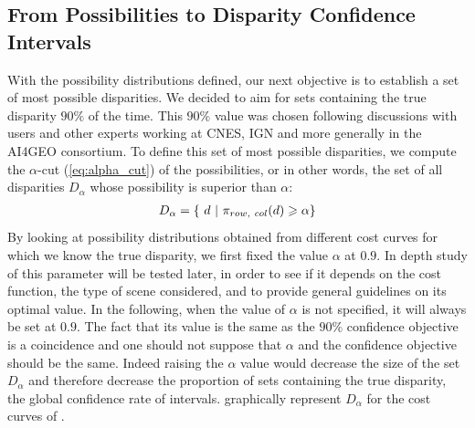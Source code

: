 \subsection{From Possibilities to Disparity Confidence Intervals}
With the possibility distributions defined, our next objective is to establish a set of most possible disparities. We decided to aim for sets containing the true disparity $90\%$ of the time. This $90\%$ value was chosen following discussions with users and other experts working at CNES, IGN and more generally in the AI4GEO consortium. To define this set of most possible disparities, we compute the $\alpha$-cut (\cref{eq:alpha_cut}) of the possibilities, or in other words, the set of all disparities $D_\alpha$ whose possibility is superior than $\alpha$:
\begin{align}
    D_\alpha=\{~ d ~|~ \pi_{row, ~col}(d)\geqslant\alpha\}\label{eq:set_of_possible_disparities}
\end{align}
By looking at possibility distributions obtained from different cost curves for which we know the true disparity, we first fixed the value $\alpha$ at $0.9$. In depth study of this parameter will be tested later, in order to see if it depends on the cost function, the type of scene considered, and to provide general guidelines on its optimal value. In the following, when the value of $\alpha$ is not specified, it will always be set at $0.9$. The fact that its value is the same as the $90\%$ confidence objective is a coincidence and one should not suppose that $\alpha$ and the confidence objective should be the same. Indeed raising the $\alpha$ value would decrease the size of the set $D_\alpha$ and therefore decrease the proportion of sets containing the true disparity, \ie the global confidence rate of intervals.  graphically represent $D_\alpha$ for the cost curves of .


